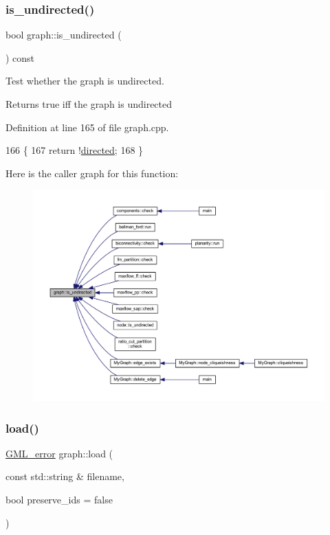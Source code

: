 \subsubsection{\texorpdfstring{is\+\_\+undirected()}{is\_undirected()}}
{\footnotesize\ttfamily bool graph\+::is\+\_\+undirected (\begin{DoxyParamCaption}{ }\end{DoxyParamCaption}) const}

Test whether the graph is undirected.

\begin{DoxyReturn}{Returns}
true iff the graph is undirected 
\end{DoxyReturn}


Definition at line 165 of file graph.\+cpp.


\begin{DoxyCode}
166 \{
167     \textcolor{keywordflow}{return} !\mbox{\hyperlink{classgraph_ab4120df210eb3d03d20b0bd27f8cbe8c}{directed}};
168 \}
\end{DoxyCode}
Here is the caller graph for this function\+:
\nopagebreak
\begin{figure}[H]
\begin{center}
\leavevmode
\includegraphics[width=350pt]{classgraph_aba427ff8ba0f70c68416ec1351344cd8_icgraph}
\end{center}
\end{figure}
\mbox{\label{classgraph_ac28cb3468623a480709d3329033d4ec8}} 
\subsubsection{\texorpdfstring{load()}{load()}\hspace{0.1cm}{\footnotesize\ttfamily [1/2]}}
{\footnotesize\ttfamily \mbox{\hyperlink{struct_g_m_l__error}{G\+M\+L\+\_\+error}} graph\+::load (\begin{DoxyParamCaption}\item[{const std\+::string \&}]{filename,  }\item[{bool}]{preserve\+\_\+ids = {\ttfamily false} }\end{DoxyParamCaption})\hspace{0.3cm}{\ttfamily [inline]}}

